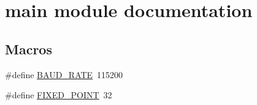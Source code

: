 \hypertarget{group__main__module}{}\section{main module documentation}
\label{group__main__module}
\subsection*{Macros}
\begin{DoxyCompactItemize}
\item 
\#define \hyperlink{group__main__module_gad4455691936f92fdd6c37566fc58ba1f}{B\+A\+U\+D\+\_\+\+R\+A\+T\+E}~115200
\item 
\#define \hyperlink{group__main__module_ga26db2f437905e35d7c8305cfd9842307}{F\+I\+X\+E\+D\+\_\+\+P\+O\+I\+N\+T}~32
\end{DoxyCompactItemize}
